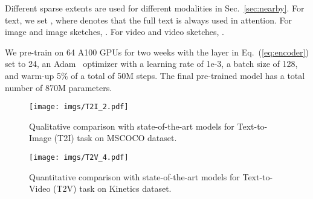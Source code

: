 \documentclass[10pt,twocolumn,letterpaper]{article}
\begin{document}
Different sparse extents are used for different modalities in Sec.~\ref{sec:nearby}. 
For text, we set , where  denotes that the full text is always used in attention. 
For image and image sketches, . 
For video and video sketches, . 

We pre-train on 64 A100 GPUs for two weeks with the layer  in Eq.~(\ref{eq:encoder}) set to 24, an Adam~\cite{Kingma_Adammethodstochastic_2014} optimizer with a learning rate of 1e-3, a batch size of 128, and warm-up 5\% of a total of 50M steps. The final pre-trained model has a total number of 870M parameters.



\begin{figure*}[t]
	\centering
	\texttt{[image: imgs/T2I\_2.pdf]}
	\caption{Qualitative comparison with state-of-the-art models for Text-to-Image (T2I) task on MSCOCO dataset.}
	\label{fig:T2I}
	\vspace{-2mm}
\end{figure*}
\begin{figure*}[t]
	\centering
	\texttt{[image: imgs/T2V\_4.pdf]}
	\caption{Quantitative comparison with state-of-the-art models for Text-to-Video (T2V) task on Kinetics dataset.}
	\label{fig:T2V_3}
	\vspace{-4mm}
\end{figure*}
\end{document}

